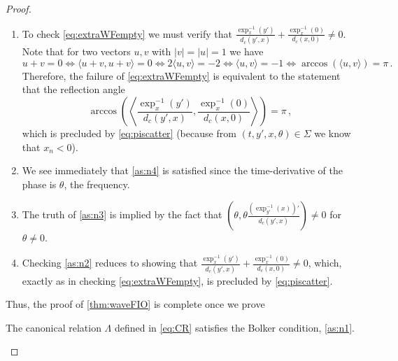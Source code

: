 \documentclass[
	fontsize=11pt, 
	twoside=false, 
	abstract=true, 
	a4paper,
]{scrartcl}
\newcommand{\abs}[1]{\left\lvert#1\right\rvert}
\begin{document}
\begin{proof}
	\begin{enumerate}[leftmargin=*,listparindent=\parindent]
		\item To check \cref{eq:extraWFempty} we must verify that $\frac{\exp_x^{-1}(y')}{d_c(y',x)}+\frac{\exp_x^{-1}(0)}{d_c(x,0)} \neq 0$. Note that for two vectors $u,v$ with $\abs{v}=\abs{u}=1$ we have
	\[
		u+v = 0 \iff \langle u+v,u+v\rangle = 0 \iff 2\langle u,v\rangle = -2 \iff \langle u,v\rangle = -1 \iff \arccos(\langle u,v\rangle) = \pi\,.
	\]
	Therefore, the failure of \cref{eq:extraWFempty} is equivalent to the statement that the reflection angle
	\[
		\arccos\left(\left\langle \frac{\exp_x^{-1}(y')}{d_c(y',x)}, \frac{\exp_x^{-1}(0)}{d_c(x,0)} \right\rangle\right) = \pi\,,
	\]
	which is precluded by \cref{eq:piscatter} (because from $(t,y',x,\theta)\in \Sigma$ we know that $x_n <0$).

	\item We see immediately that \ref{as:n4} is satisfied since the time-derivative of the phase is $\theta$, the frequency.

	\item The truth of \ref{as:n3} is implied by the fact that $\left(\theta,\theta\frac{(\exp_{y'}^{-1}(x))'}{d_c(y',x)}\right) \neq 0$ for $\theta\neq 0$.

	\item Checking \ref{as:n2} reduces to showing that $\frac{\exp_x^{-1}(y')}{d_c(y',x)}+\frac{\exp_x^{-1}(0)}{d_c(x,0)} \neq 0$, which, exactly as in checking \cref{eq:extraWFempty}, is precluded by \cref{eq:piscatter}.
	\end{enumerate}

	Thus, the proof of \cref{thm:waveFIO} is complete once we prove
	\begin{lemma}\label{lem:bolker}
		The canonical relation $\Lambda$ defined in \cref{eq:CR} satisfies the Bolker condition, \ref{as:n1}.
	\end{lemma}
	\end{proof}
\end{document}
